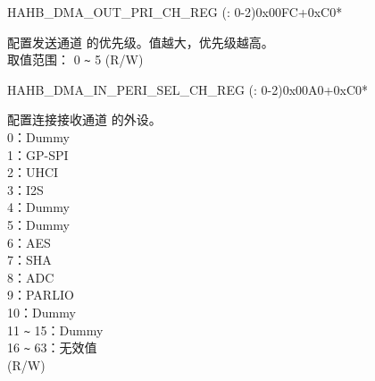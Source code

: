 \begin{register}{H}{AHB\_DMA\_OUT\_PRI\_CH\_REG (: 0-2)}{0x00FC+0xC0*}\label{regdesc:AHBDMAOUTPRICHNREG}
%
%
\regnewline%
\begin{regdesc}\begin{reglist}
\label{fielddesc:AHBDMATXPRICHN}\item [AHB\_DMA\_TX\_PRI\_CH\regindex{n}] 配置发送通道  的优先级。值越大，优先级越高。 \\
取值范围： 0 \verb+~+ 5 (R/W)
\end{reglist}\end{regdesc}
\end{register}


\begin{register}{H}{AHB\_DMA\_IN\_PERI\_SEL\_CH\_REG (: 0-2)}{0x00A0+0xC0*}\label{regdesc:AHBDMAINPERISELCHNREG}
%
%
\regnewline%
\begin{regdesc}\begin{reglist}
\label{fielddesc:AHBDMAPERIINSELCHN}\item [AHB\_DMA\_PERI\_IN\_SEL\_CH\regindex{n}] 配置连接接收通道  的外设。\\
0：Dummy\\ 1：GP-SPI\\ 2：UHCI\\ 3：I2S\\ 4：Dummy\\ 5：Dummy\\ 6：AES\\ 7：SHA\\ 8：ADC\\ 9：PARLIO\\ 10：Dummy\\ 11 \verb+~+ 15：Dummy\\
16 \verb+~+ 63：无效值\\ (R/W)
\end{reglist}\end{regdesc}
\end{register}


